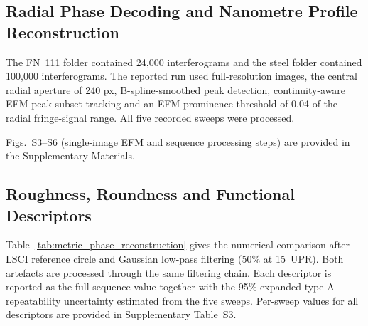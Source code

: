 \documentclass[review]{elsarticle}
\begin{document}
\subsection{Radial Phase Decoding and Nanometre Profile Reconstruction}
The FN~111 folder contained 24,000 interferograms and the steel folder contained 100,000 interferograms. The reported run used full-resolution images, the central radial aperture of 240 px, B-spline-smoothed peak detection, continuity-aware EFM peak-subset tracking and an EFM prominence threshold of 0.04 of the radial fringe-signal range. All five recorded sweeps were processed.

Figs.~S3--S6 (single-image EFM and sequence processing steps) are provided in the Supplementary Materials.

\subsection{Roughness, Roundness and Functional Descriptors}
Table~\ref{tab:metric_phase_reconstruction} gives the numerical comparison after LSCI reference circle and Gaussian low-pass filtering (50\% at 15~UPR). Both artefacts are processed through the same filtering chain. Each descriptor is reported as the full-sequence value together with the 95\% expanded type-A repeatability uncertainty estimated from the five sweeps. Per-sweep values for all descriptors are provided in Supplementary Table~S3.
\end{document}
